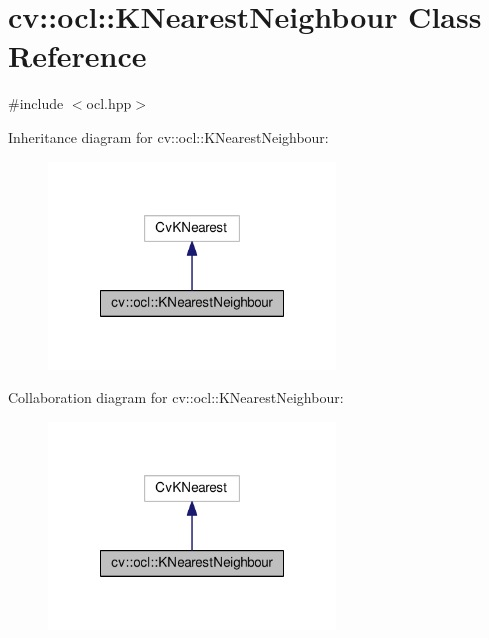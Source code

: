 \hypertarget{classcv_1_1ocl_1_1KNearestNeighbour}{\section{cv\-:\-:ocl\-:\-:K\-Nearest\-Neighbour Class Reference}
\label{classcv_1_1ocl_1_1KNearestNeighbour}
}


{\ttfamily \#include $<$ocl.\-hpp$>$}



Inheritance diagram for cv\-:\-:ocl\-:\-:K\-Nearest\-Neighbour\-:\nopagebreak
\begin{figure}[H]
\begin{center}
\leavevmode
\includegraphics[width=216pt]{classcv_1_1ocl_1_1KNearestNeighbour__inherit__graph}
\end{center}
\end{figure}


Collaboration diagram for cv\-:\-:ocl\-:\-:K\-Nearest\-Neighbour\-:\nopagebreak
\begin{figure}[H]
\begin{center}
\leavevmode
\includegraphics[width=216pt]{classcv_1_1ocl_1_1KNearestNeighbour__coll__graph}
\end{center}
\end{figure}
